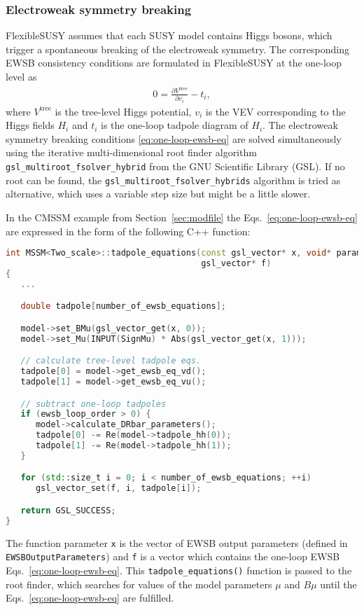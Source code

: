 \documentclass[final,3p,11pt,pdflatex]{elsarticle}
\makeatletter
\newcommand{\fs}{FlexibleSUSY\@\xspace}
\newcommand{\code}[1]{\lstinline|#1|}  %
\newcommand{\secref}[1]{Section~\ref{#1}}
\makeatother
\begin{document}
\subsubsection{Electroweak symmetry breaking}
\label{sec:ewsb}

\fs assumes that each SUSY model contains Higgs bosons, which trigger
a spontaneous breaking of the electroweak symmetry.  The corresponding
EWSB consistency conditions are formulated in \fs at the one-loop
level as
%
\begin{align}
  0 = \frac{\partial V^\text{tree}}{\partial v_i} - t_i,
  \label{eq:one-loop-ewsb-eq}
\end{align}
%
where $V^\text{tree}$ is the tree-level Higgs potential, $v_i$ is the
VEV corresponding to the Higgs fields $H_i$ and $t_i$ is the one-loop
tadpole diagram of $H_i$.  The electroweak symmetry breaking
conditions \eqref{eq:one-loop-ewsb-eq} are solved simultaneously using
the iterative multi-dimensional root finder algorithm
\code{gsl_multiroot_fsolver_hybrid} from the GNU Scientific Library
(GSL).  If no root can be found, the
\code{gsl_multiroot_fsolver_hybrids} algorithm is tried as
alternative, which uses a variable step size but might be a little
slower.

In the CMSSM example from \secref{sec:modfile} the
Eqs.~\eqref{eq:one-loop-ewsb-eq} are expressed in the form of the
following C++ function:
%
\begin{lstlisting}[language=C++]
int MSSM<Two_scale>::tadpole_equations(const gsl_vector* x, void* params,
                                       gsl_vector* f)
{
   ...

   double tadpole[number_of_ewsb_equations];

   model->set_BMu(gsl_vector_get(x, 0));
   model->set_Mu(INPUT(SignMu) * Abs(gsl_vector_get(x, 1)));

   // calculate tree-level tadpole eqs.
   tadpole[0] = model->get_ewsb_eq_vd();
   tadpole[1] = model->get_ewsb_eq_vu();

   // subtract one-loop tadpoles
   if (ewsb_loop_order > 0) {
      model->calculate_DRbar_parameters();
      tadpole[0] -= Re(model->tadpole_hh(0));
      tadpole[1] -= Re(model->tadpole_hh(1));
   }

   for (std::size_t i = 0; i < number_of_ewsb_equations; ++i)
      gsl_vector_set(f, i, tadpole[i]);

   return GSL_SUCCESS;
}
\end{lstlisting}
%
The function parameter \code{x} is the vector of EWSB output
parameters (defined in \code{EWSBOutputParameters}) and \code{f} is a
vector which contains the one-loop EWSB Eqs.\
\eqref{eq:one-loop-ewsb-eq}.  This \code{tadpole_equations()} function
is passed to the root finder, which searches for values of the model
parameters $\mu$ and $B\mu$ until the Eqs.\
\eqref{eq:one-loop-ewsb-eq} are fulfilled.
\end{document}
